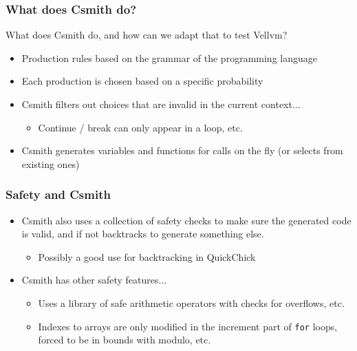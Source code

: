 \documentclass{beamer}
\begin{document}
\begin{frame}
    \frametitle{What does Csmith do?}
  What does Csmith do, and how can we adapt that to test Vellvm?

  \begin{itemize}
  \item Production rules based on the grammar of the programming
    language
  \item Each production is chosen based on a specific probability
  \item Csmith filters out choices that are invalid in the current
    context...
    \begin{itemize}
    \item Continue / break can only appear in a loop, etc.
    \end{itemize}
  \item Csmith generates variables and functions for calls on the fly
    (or selects from existing ones)
  \end{itemize}
\end{frame}

\begin{frame}
  \frametitle{Safety and Csmith}
  \begin{itemize}
  \item Csmith also uses a collection of safety checks to make sure
    the generated code is valid, and if not backtracks to generate
    something else.
    \begin{itemize}
    \item Possibly a good use for backtracking in QuickChick
    \end{itemize}
  \item Csmith has other safety features...
    \begin{itemize}
    \item Uses a library of safe arithmetic operators with checks for
      overflows, etc.
    \item Indexes to arrays are only modified in the increment part of
      {\tt for} loops, forced to be in bounds with modulo, etc.
    \end{itemize}
  \end{itemize}

\end{frame}


\end{document}
